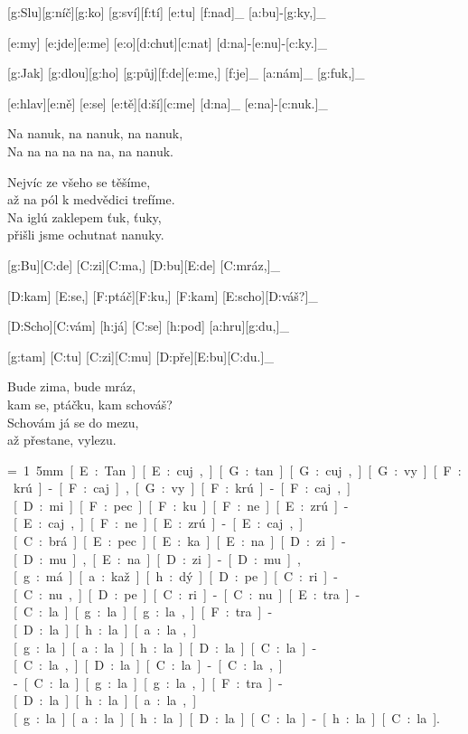 
[g:Slu][g:níč][g:ko] [g:sví][f:tí] [e:tu] [f:nad]_ [a:bu]-[g:ky,]_

[e:my] [e:jde][e:me] [e:o][d:chut][c:nat] [d:na]-[e:nu]-[c:ky.]_

[g:Jak] [g:dlou][g:ho] [g:půj][f:de][e:me,] [f:je]_ [a:nám]_ [g:fuk,]_

[e:hlav][e:ně] [e:se] [e:tě][d:ší][c:me] [d:na]_ [e:na]-[c:nuk.]_

Na nanuk, na nanuk, na nanuk,\\
Na na na na na na, na nanuk.

Nejvíc ze všeho se těšíme,\\
až na pól k medvědici trefíme.\\
Na iglú zaklepem ťuk, ťuky,\\
přišli jsme ochutnat nanuky.



[g:Bu][C:de] [C:zi][C:ma,] [D:bu][E:de] [C:mráz,]_

[D:kam] [E:se,] [F:ptáč][F:ku,] [F:kam] [E:scho][D:váš?]_

[D:Scho][C:vám] [h:já] [C:se] [h:pod] [a:hru][g:du,]_

[g:tam] [C:tu] [C:zi][C:mu] [D:pře][E:bu][C:du.]_

Bude zima, bude mráz,\\
kam se, ptáčku, kam schováš?\\
Schovám já se do mezu,\\
až přestane, vylezu.\\



{\unit=1.5mm
[E:Tan][E:cuj,] [G:tan][G:cuj,] [G:vy][F:krú]-[F:caj], [G:vy][F:krú]-[F:caj,]\\
[D:len] [D:mi] [F:pec][F:ku] [F:ne][E:zrú]-[E:caj,] [F:ne][E:zrú]-[E:caj,]\\
[C:do][C:brá] [E:pec][E:ka] [E:na] [D:zi]-[D:mu], [E:na] [D:zi]-[D:mu],\\
[G:ne][g:má] [a:kaž][h:dý] [D:pe][C:ri]-[C:nu,] [D:pe][C:ri]-[C:nu.]

[E:tra]-[C:la][g:la][g:la,] [F:tra]-[D:la][h:la][a:la,]\\
[g:tra][g:la][a:la][h:la][D:la][C:la]-[C:la,] [D:la][C:la]-[C:la,]\\
[E:tra]-[C:la][g:la][g:la,] [F:tra]-[D:la][h:la][a:la,]\\
[g:tra][g:la][a:la][h:la][D:la][C:la]-[h:la][C:la].
}

